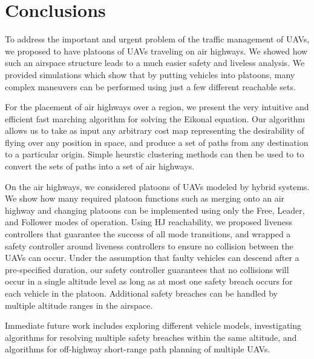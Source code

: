 \section{Conclusions}
To address the important and urgent problem of the traffic management of UAVs, we proposed to have platoons of UAVs traveling on air highways. We showed how such an airspace structure leads to a much easier safety and liveless analysis. We provided simulations which show that by putting vehicles into platoons, many complex maneuvers can be performed using just a few different reachable sets.

For the placement of air highways over a region, we present the very intuitive and efficient fast marching algorithm for solving the Eikonal equation. Our algorithm allows us to take as input any arbitrary cost map representing the desirability of flying over any position in space, and produce a set of paths from any destination to a particular origin. Simple heurstic clustering methods can then be used to to convert the sets of paths into a set of air highways.

On the air highways, we considered platoons of UAVs modeled by hybrid systems. We show how many required platoon functions such as merging onto an air highway and changing platoons can be implemented using only the Free, Leader, and Follower modes of operation. Using HJ reachability, we proposed liveness controllers that guarantee the success of all mode transitions, and wrapped a safety controller around liveness controllers to ensure no collision between the UAVs can occur. Under the assumption that faulty vehicles can descend after a pre-specified duration, our safety controller guarantees that no collisions will occur in a single altitude level as long as at most one safety breach occurs for each vehicle in the platoon. Additional safety breaches can be handled by multiple altitude ranges in the airspace. 

Immediate future work includes exploring different vehicle models, investigating algorithms for resolving multiple safety breaches within the same altitude, and algorithms for off-highway short-range path planning of multiple UAVs.
